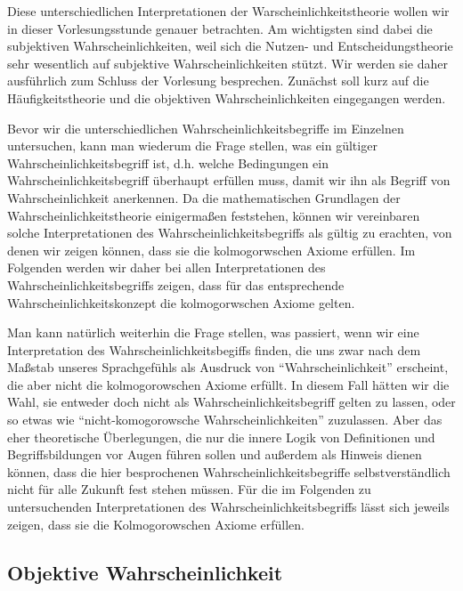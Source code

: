 Diese unterschiedlichen
Interpretationen der Warscheinlichkeitstheorie wollen wir in dieser 
Vorlesungsstunde genauer betrachten. Am wichtigsten sind dabei
die subjektiven Wahrscheinlichkeiten, weil sich die Nutzen- und
Entscheidungstheorie sehr wesentlich auf subjektive Wahrscheinlichkeiten stützt.
Wir werden sie daher ausführlich zum Schluss der Vorlesung besprechen. Zunächst
soll kurz auf die Häufigkeitstheorie und die objektiven Wahrscheinlichkeiten
eingegangen werden.

Bevor wir die unterschiedlichen Wahrscheinlichkeitsbegriffe im Einzelnen
untersuchen, kann man wiederum die Frage stellen, was ein gültiger
Wahrscheinlichkeitsbegriff ist, d.h. welche Bedingungen ein
Wahrscheinlichkeitsbegriff überhaupt erfüllen muss, damit wir ihn als Begriff
von Wahrscheinlichkeit anerkennen. Da die mathematischen Grundlagen der
Wahrscheinlichkeitstheorie einigermaßen feststehen, können wir vereinbaren
solche Interpretationen des Wahrscheinlichkeitsbegriffs als gültig zu erachten,
von denen wir zeigen können, dass sie die kolmogorwschen Axiome erfüllen.
Im Folgenden werden wir daher bei allen
Interpretationen des Wahrscheinlichkeitsbegriffs zeigen, dass für
das entsprechende Wahrscheinlichkeitskonzept die kolmogorwschen Axiome gelten.

Man kann natürlich weiterhin die Frage stellen, was passiert, wenn wir eine
Interpretation des Wahrscheinlichkeitsbegiffs finden, die uns zwar nach dem
Maßstab unseres Sprachgefühls als Ausdruck von "`Wahrscheinlichkeit"'
erscheint, die aber nicht die kolmogorowschen Axiome erfüllt. In diesem Fall
hätten wir die Wahl, sie entweder doch nicht als Wahrscheinlichkeitsbegriff
gelten zu lassen, oder so etwas wie "`nicht-komogorowsche
Wahrscheinlichkeiten"' zuzulassen. Aber das eher theoretische
Überlegungen, die nur die innere Logik von Definitionen und Begriffsbildungen
vor Augen führen sollen und außerdem als Hinweis dienen können, dass die hier
besprochenen Wahrscheinlichkeitsbegriffe selbstverständlich nicht für alle
Zukunft fest stehen müssen. Für die im Folgenden zu untersuchenden
Interpretationen des Wahrscheinlichkeitsbegriffs lässt sich jeweils zeigen,
dass sie die Kolmogorowschen Axiome erfüllen.

\subsection{Objektive Wahrscheinlichkeit}

